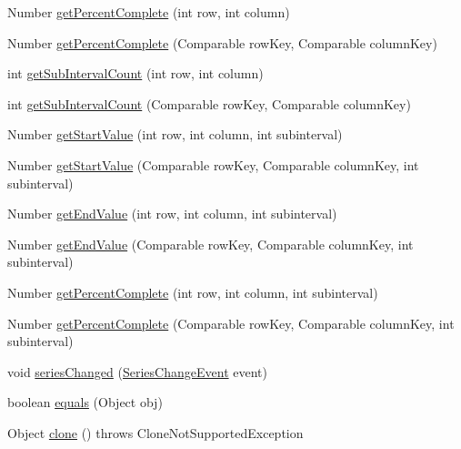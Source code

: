 \begin{DoxyCompactItemize}
Number \mbox{\hyperlink{classorg_1_1jfree_1_1data_1_1gantt_1_1_task_series_collection_aca8d6ce318feece476883aa73a5cd32e}{get\+Percent\+Complete}} (int row, int column)
\item 
Number \mbox{\hyperlink{classorg_1_1jfree_1_1data_1_1gantt_1_1_task_series_collection_a9c2470a0f1165d3c1554101e65ecc825}{get\+Percent\+Complete}} (Comparable row\+Key, Comparable column\+Key)
\item 
int \mbox{\hyperlink{classorg_1_1jfree_1_1data_1_1gantt_1_1_task_series_collection_a9172210b4a2939c4a0ffa073a11f0792}{get\+Sub\+Interval\+Count}} (int row, int column)
\item 
int \mbox{\hyperlink{classorg_1_1jfree_1_1data_1_1gantt_1_1_task_series_collection_af4aa8478ec30350d17361e896ef45ee7}{get\+Sub\+Interval\+Count}} (Comparable row\+Key, Comparable column\+Key)
\item 
Number \mbox{\hyperlink{classorg_1_1jfree_1_1data_1_1gantt_1_1_task_series_collection_a570e8b8e8a7078f73ec35f7d14eec5d3}{get\+Start\+Value}} (int row, int column, int subinterval)
\item 
Number \mbox{\hyperlink{classorg_1_1jfree_1_1data_1_1gantt_1_1_task_series_collection_afc8407c3f9a83fb1e637060f678abae6}{get\+Start\+Value}} (Comparable row\+Key, Comparable column\+Key, int subinterval)
\item 
Number \mbox{\hyperlink{classorg_1_1jfree_1_1data_1_1gantt_1_1_task_series_collection_a8a8c5440012051ae6ac64fc6f5fbc55f}{get\+End\+Value}} (int row, int column, int subinterval)
\item 
Number \mbox{\hyperlink{classorg_1_1jfree_1_1data_1_1gantt_1_1_task_series_collection_aeedad40761eb5414845f7e9d56b7fcb6}{get\+End\+Value}} (Comparable row\+Key, Comparable column\+Key, int subinterval)
\item 
Number \mbox{\hyperlink{classorg_1_1jfree_1_1data_1_1gantt_1_1_task_series_collection_a3d658e0e626d6527071c846fdfc7fc41}{get\+Percent\+Complete}} (int row, int column, int subinterval)
\item 
Number \mbox{\hyperlink{classorg_1_1jfree_1_1data_1_1gantt_1_1_task_series_collection_a6344934faba17e1b60e8fb93dac73c07}{get\+Percent\+Complete}} (Comparable row\+Key, Comparable column\+Key, int subinterval)
\item 
void \mbox{\hyperlink{classorg_1_1jfree_1_1data_1_1gantt_1_1_task_series_collection_a57bb72acb135fb0dea4ff321dd58faa4}{series\+Changed}} (\mbox{\hyperlink{classorg_1_1jfree_1_1data_1_1general_1_1_series_change_event}{Series\+Change\+Event}} event)
\item 
boolean \mbox{\hyperlink{classorg_1_1jfree_1_1data_1_1gantt_1_1_task_series_collection_a3a749c23d13feb1598f61ffa0ebfe2cc}{equals}} (Object obj)
\item 
Object \mbox{\hyperlink{classorg_1_1jfree_1_1data_1_1gantt_1_1_task_series_collection_a7cfdabdbf256ff3ba7e72bb5ff175ee5}{clone}} ()  throws Clone\+Not\+Supported\+Exception 
\end{DoxyCompactItemize}
